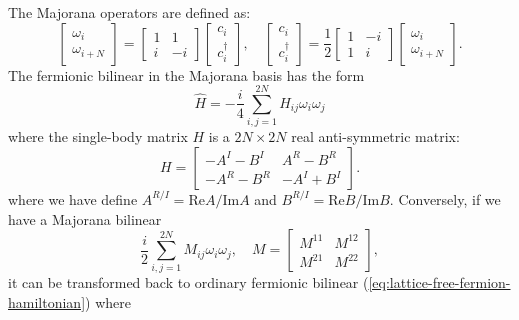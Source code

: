 \documentclass[aps,prb,superscriptaddress,nofootinbib]{revtex4}
\begin{document}
The Majorana operators are defined as:
\begin{equation}
	\left[\begin{array}{c} \omega_{i} \\ \omega_{i+N} \end{array}\right]
	= \left[\begin{array}{cc} 
		1 & 1 \\ 
		i & -i 
	\end{array}\right] \left[\begin{array}{c} 
		c_i \\ c_i^\dagger 
	\end{array}\right], \quad 
	\left[\begin{array}{c} c_i \\ c_i^\dagger \end{array}\right]
	= \frac{1}{2} \left[\begin{array}{cc} 
		1 & -i \\ 
		1 & i 
	\end{array}\right] \left[\begin{array}{c} 
		\omega_{i} \\ \omega_{i+N}
	\end{array}\right].
\end{equation}
The fermionic bilinear in the Majorana basis has the form
\begin{equation}
	\hat H = -\frac{i}{4} \sum_{i,j=1}^{2N} H_{ij} \omega_i \omega_j
\end{equation}
where the single-body matrix $H$ is a $2N \times 2N$ real anti-symmetric matrix:
\begin{equation}
	H = \left[\begin{array}{cc} 
		-A^I - B^I & A^R - B^R \\
    	-A^R - B^R &  -A^I + B^I 
	\end{array}\right].
\end{equation}
where we have define $A^{R/I} = \mathrm{Re} A / \mathrm{Im} A$ and $B^{R/I} = \mathrm{Re} B / \mathrm{Im} B$.
Conversely, if we have a Majorana bilinear 
\begin{equation}
	\frac{i}{2} \sum_{i,j=1}^{2N} M_{ij}\omega_i \omega_j, \quad
	M = \left[\begin{array}{cc}
		M^{11} & M^{12} \\ M^{21} & M^{22}
	\end{array} \right],
\end{equation}
it can be transformed back to ordinary fermionic bilinear (\ref{eq:lattice-free-fermion-hamiltonian}) where
\end{document}
